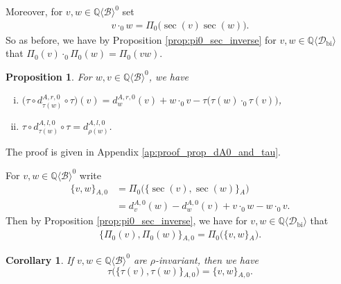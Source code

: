 \documentclass[12pt,reqno]{amsart}
\newtheorem{prop}[thm]{Proposition}
\newtheorem{cor}[thm]{Corollary}
\numberwithin{equation}{section}
\theoremstyle{definition}
\newcommand{\QQ}{\mathbb{Q}}
\newcommand{\B}{\mathcal{B}}
\newcommand{\QB}{\QQ\langle \B\rangle}
\newcommand{\Dbi}{\mathcal{D}_{\operatorname{bi}}}
\newcommand{\QDbi}{\QQ\langle \Dbi\rangle}
\newcommand{\ari}[2]{\{#1,#2\}\!_A}
\newcommand{\arizero}[2]{\{#1,#2\}\!_{A,0}}
\newcommand{\derzero}[1]{d_{#1}^{A,0}}
\newcommand{\derrzero}[1]{d_{#1}^{A,r,0}}
\newcommand{\derlzero}[1]{d_{#1}^{A,l,0}}
\newcommand{\conczero}{\cdot_0}
\newcommand{\pizero}{\Pi_0}
\begin{document}
Moreover, for $v,w\in \QB^0$ set
\begin{align} \label{eq:conzero}
v \conczero w= \pizero\big(\sec(v)\sec(w)\big).
\end{align}
So as before, we have by Proposition \ref{prop:pi0_sec_inverse} for $v,w\in \QDbi$ that $\pizero(v)\conczero\pizero(w)=\pizero(vw)$.

\begin{prop} \label{prop:dA0_and_tau} For $w,v\in \QB^0$, we have
\begin{enumerate}[(i)]
\item $\big(\tau\circ \derrzero{\tau(w)}\circ \tau\big)(v)= \derrzero{w}(v)+w \conczero v-\tau\big(\tau(w)\conczero\tau(v)\big)$,
\item $\tau\circ \derlzero{\tau(w)}\circ \tau=\derlzero{\rho(w)}$.
\end{enumerate}
\end{prop}

The proof is given in Appendix \ref{ap:proof_prop_dA0_and_tau}.

\vspace{0,4cm}
For $v,w\in \QB^0$ write 
\begin{align} \label{eq:arizero}
\arizero{v}{w}&=\pizero\big(\ari{\sec(v)}{\sec(w)}\big) \nonumber \\
&=\derzero{v}(w)-\derzero{w}(v)+v\conczero w - w\conczero v.
\end{align}
Then by Proposition \ref{prop:pi0_sec_inverse}, we have for $v,w\in \QDbi$ that 
\begin{align} \label{eq:Lie_brack_QB0} \arizero{\pizero(v)}{\pizero(w)}=\pizero\big(\ari{v}{w}\big).
\end{align}

\begin{cor} \label{cor:Lie_brack_tau_inv} If $v,w\in \QB^0$ are $\rho$-invariant, then we have
	\[\tau\big(\arizero{\tau(v)}{\tau(w)}\big)=\arizero{v}{w}.\]
\end{cor}
\end{document}
